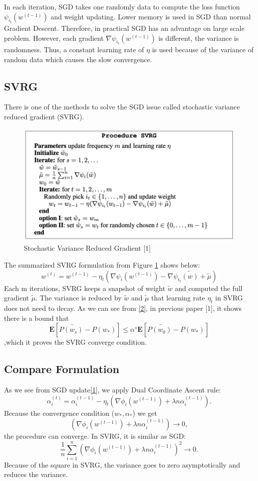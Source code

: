 \documentclass{article}
\begin{document}
In each iteration, SGD takes one randomly data to compute the loss function $\psi_{i_{t}}(w^{(t-1)})$ and weight updating. Lower memory is used in SGD than normal Gradient Descent. Therefore, in practical SGD has an advantage on large scale problem. However, each gradient $\nabla\psi_{i_{t}}(w^{(t-1)})$ is different, the variance is randomness. Thus, a constant learning rate of $\eta$ is used because of the variance of random data which causes the slow convergence.
\subsection{SVRG}
There is one of the methods to solve the SGD issue called stochastic variance reduced gradient (SVRG).
\begin{figure}[h!]
\centering
\includegraphics[scale=0.7]{SVRG.png}
\caption{Stochastic Variance Reduced Gradient [1] }
\label{fig:1}
\end{figure}

The summarized SVRG formulation from Figure \ref{fig:1}  shows below:
\[w^{(t)}=w^{(t-1)}-\eta_{t}(\nabla\psi_{i}(w^{(t-1)})-\nabla\psi_{i_{t}}\tilde{(w)}+\tilde{\mu})\tag{2}\label{2}\]
Each m iterations, SVRG keeps a snapshot of weight $\tilde{w}$ and computed the full gradient $\tilde{\mu}$. The variance is reduced by $\tilde{w}$ and $\tilde{\mu}$ that learning rate $\eta_{t}$ in SVRG does not need to decay.
As we can see from \eqref{2}, in previous paper [1], it shows there is a bound that
\[\mathbf{E}[P\tilde{(w_{s})}-P(w_{*})]\leq \alpha^s\mathbf{E}[P\tilde{(w_{0})}-P(w_{*})]\]
,which it proves the SVRG converge condition.
\subsection{Compare Formulation}
As we see from SGD update\eqref{1}, we apply Dual Coordinate Ascent rule:
\[\alpha^{(t)}_{i}=\alpha^{(t-1)}_{i}-\eta_{t}(\nabla\phi_{i}(w^{(t-1)})+\lambda n\alpha^{(t-1)}_{i})
.\]
Because the convergence condition ($w_{*},\alpha_{*}$) we get
\[(\nabla\phi_{i}(w^{(t-1)})+\lambda n\alpha^{(t-1)}_{i})\xrightarrow{}0,
\]
the procedure can converge. In SVRG, it is similar as SGD:
\[\frac{1}{n}\sum_{i=1}^{n}(\nabla\phi_{i}(w^{(t-1)})+\lambda n\alpha^{(t-1)}_{i})^2 \xrightarrow{}0.
\]
Because of the square in SVRG, the variance goes to zero asymptotically and reduces the variance.
\end{document}
